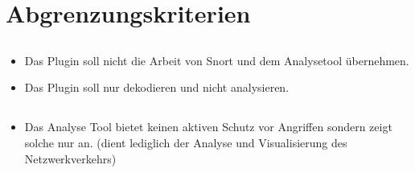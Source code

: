 \section{Abgrenzungskriterien}

\subsection{\sppname}
\begin{itemize}
\item Das Plugin soll nicht die Arbeit von Snort und dem Analysetool übernehmen.

\item Das Plugin soll nur dekodieren und nicht analysieren.

\end{itemize}

\subsection{\programname}
\begin{itemize}

\item Das Analyse Tool bietet keinen aktiven Schutz vor Angriffen sondern zeigt solche nur an. (dient lediglich der Analyse und Visualisierung des Netzwerkverkehrs)

\end{itemize} 